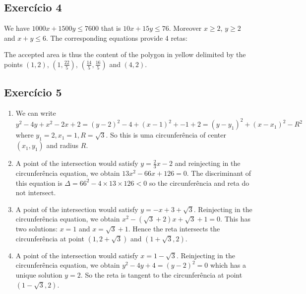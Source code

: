 \subsection*{Exercício 4}

We have $1000x + 1500y \leq 7600$ that is $10x+15y \leq 76$. Moreover
$x \geq 2$, $y \geq 2$ and $x + y \leq 6$. The corresponding equations
provide 4 retas:

\begin{center}
\end{center}

The accepted area is thus the content of the polygon in yellow delimited
by the points $(1,2)$, $\left(1,\frac{22}{5}\right)$,
$\left(\frac{14}{5},\frac{16}{5}\right)$ and $(4,2)$.

\subsection*{Exercício 5}

\begin{enumerate}
\item We can write
  $y^2-4y+x^2-2x+2 = {(y - 2)}^2 - 4 + {(x-1)}^2 + - 1 + 2 =
  {(y - y_1)}^2 + {(x-x_1)}^2 - R^2$
  where $y_1=2,x_1=1,R = \sqrt{3}$. So this is uma circunferência
  of center $(x_1,y_1)$ and radius $R$.
\item A point of the intersection would satisfy
  $y = \frac{2}{3}x - 2$ and reinjecting in the circunferência equation,
  we obtain $13x^2 -66x+126=0$. The discriminant of this equation is
  $\Delta = 66^2 - 4\times13\times126 < 0$ so the circunferência and reta
  do not intersect.
\item A point of the intersection would satisfy
  $y = -x + 3 + \sqrt{3}$. Reinjecting in the circunferência equation,
  we obtain $x^2 -{(\sqrt{3}+2)}x + \sqrt{3}+1 = 0$.
  This has two solutions: $x=1$ and $x=\sqrt{3}+1$.
  Hence the reta intersects the circunferência at point
  $(1,2+\sqrt{3})$ and $(1+\sqrt{3}, 2)$.
\item A point of the intersection would satisfy
  $x = 1 - \sqrt{3}$. Reinjecting in the circunferência equation,
  we obtain $y^2-4y+4={(y-2)}^2=0$ which has a unique solution $y=2$.
  So the reta is tangent to the circunferência at point
  $(1 - \sqrt{3}, 2)$.
\end{enumerate}


